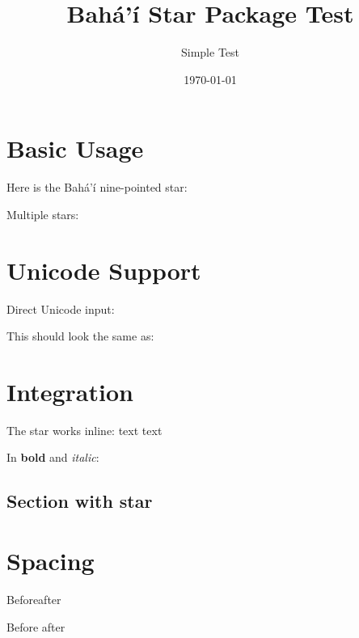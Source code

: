 \documentclass{article}
\begin{document}
\title{Bahá'í Star Package Test}
\author{Simple Test}
\date{\today}
\maketitle

\section{Basic Usage}

Here is the Bahá'í nine-pointed star: \bahaistar

Multiple stars: \bahaistar{} \bahaistar{} \bahaistar

\section{Unicode Support}

Direct Unicode input: 🟙

This should look the same as: \bahaistar

\section{Integration}

The star works inline: text \bahaistar{} text

In \textbf{bold} and \textit{italic}: \textbf{\bahaistar} \textit{\bahaistar}

\subsection{Section with star \bahaistar}

\section{Spacing}

Before\bahaistar{}after

Before \bahaistar{} after
\end{document}
